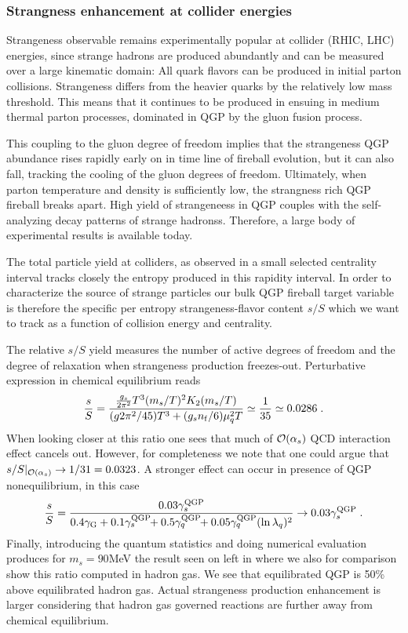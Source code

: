 \subsubsection{Strangness enhancement at collider energies}\label{sec:sS}

Strangeness observable remains experimentally popular at collider (RHIC, LHC) energies, since strange hadrons are produced abundantly and can be measured over a large kinematic domain: All quark flavors can be produced in initial parton collisions. Strangeness differs from the heavier quarks by the relatively low mass threshold. This means that it continues to be produced in ensuing in medium thermal parton processes, dominated in QGP by the gluon fusion process.

This coupling to the gluon degree of freedom implies that the strangeness QGP abundance rises rapidly early on in time line of fireball evolution, but it can also fall, tracking the cooling of the gluon degrees of freedom. Ultimately, when parton temperature and density is sufficiently low, the strangness rich QGP fireball breaks apart. High yield of strangeneess in QGP couples with the self-analyzing decay patterns of strange hadronss. Therefore, a large body of experimental results is available today. 

The total particle yield at colliders, as observed in a small selected centrality interval tracks closely the entropy produced in this rapidity interval. In order to characterize the source of strange particles our bulk QGP fireball target variable is therefore the specific per entropy strangeness-flavor content $s/S$ which we want to track as a function of collision energy and centrality. 

The relative $s/S$ yield measures the number of active degrees of freedom and the degree of relaxation when strangeness production freezes-out. Perturbative expression in chemical equilibrium reads 
\begin{equation}
{s \over S}=\frac{{g_s\over 2\pi^2} T^3 (m_{ s}/T)^2K_2(m_{ s}/T)}
 {(g2\pi^2/ 45) T^3 +(g_s n_{\rm f}/6)\mu_q^2T}\simeq \frac{1}{35}\simeq 0.0286\;.
\end{equation}
When looking closer at this ratio one sees that much of ${\cal O}(\alpha_s)$ QCD interaction effect cancels out. However, for completeness we note that one could argue that $s/S|_{{\cal O}(\alpha_s)}\to 1/31=0.0323$. A stronger effect can occur in presence of QGP nonequilibrium, in this case
\begin{equation}
{s \over S}= { {0.03 \gamma_s^{\rm QGP}} \over 
 {0.4 \gamma_{\rm G} + 
 0.1 \gamma_s^{\rm QGP}\!\!+
 0.5\gamma_q^{\rm QGP}\!\! + 
 0.05 \gamma_q^{\rm QGP} (\ln \lambda_q)^2}}\to 0.03\gamma_s^{\rm QGP}\;.
\end{equation}
Finally, introducing the quantum statistics and doing numerical evaluation produces for $m_s=90$\;MeV the result seen on left in  where we also for comparison show this ratio computed in hadron gas. We see that equilibrated QGP is 50\% above equilibrated hadron gas. Actual strangeness production enhancement is larger considering that hadron gas governed reactions are further away from chemical equilibrium. 

